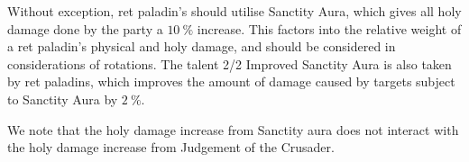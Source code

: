 \documentclass[letterpaper,11pt]{article}
\begin{document}
	Without exception, ret paladin's should utilise Sanctity Aura, which gives all holy damage done by the party a $10~\%$ increase.
	This factors into the relative weight of a ret paladin's physical and holy damage, and should be considered in considerations of rotations.
	The talent 2/2 Improved Sanctity Aura is also taken by ret paladins, which improves the amount of damage caused by targets subject to Sanctity Aura by $2~\%$.
	
	We note that the holy damage increase from Sanctity aura does not interact with the holy damage increase from Judgement of the Crusader.
	

	

%	
%	
%	
%


	\appendix
	
\end{document}

